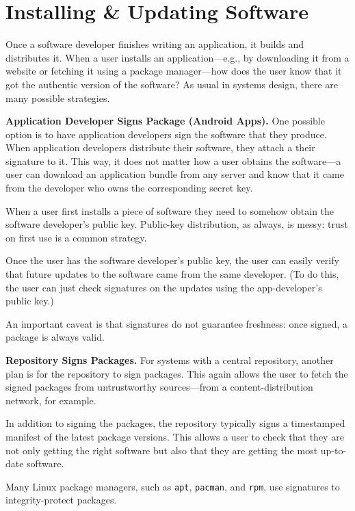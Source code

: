 \documentclass[
  letterpaper,
]{scrbook}
\theoremstyle{definition}
\theoremstyle{plain}
\theoremstyle{plain}
\theoremstyle{remark}
\begin{document}
\section{Installing \& Updating
Software}\label{installing-updating-software}

Once a software developer finishes writing an application, it builds and
distributes it. When a user installs an application---e.g., by
downloading it from a website or fetching it using a package
manager---how does the user know that it got the authentic version of
the software? As usual in systems design, there are many possible
strategies.

\textbf{Application Developer Signs Package (Android Apps).} One
possible option is to have application developers sign the software that
they produce. When application developers distribute their software,
they attach a their signature to it. This way, it does not matter how a
user obtains the software---a user can download an application bundle
from any server and know that it came from the developer who owns the
corresponding secret key.

When a user first installs a piece of software they need to somehow
obtain the software developer's public key. Public-key distribution, as
always, is messy: trust on first use is a common strategy.

Once the user has the software developer's public key, the user can
easily verify that future updates to the software came from the same
developer. (To do this, the user can just check signatures on the
updates using the app-developer's public key.)

An important caveat is that signatures do not guarantee freshness: once
signed, a package is always valid.

\textbf{Repository Signs Packages.} For systems with a central
repository, another plan is for the repository to sign packages. This
again allows the user to fetch the signed packages from untrustworthy
sources---from a content-distribution network, for example.

In addition to signing the packages, the repository typically signs a
timestamped manifest of the latest package versions. This allows a user
to check that they are not only getting the right software but also that
they are getting the most up-to-date software.

Many Linux package managers, such as \texttt{apt}, \texttt{pacman}, and
\texttt{rpm}, use signatures to integrity-protect packages.
\end{document}
